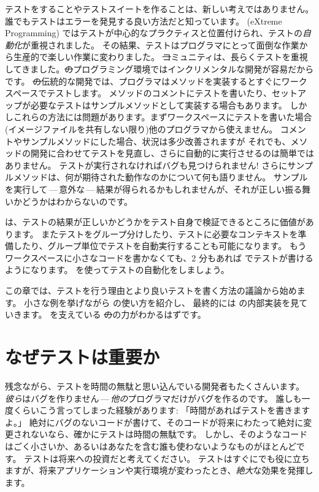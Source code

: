 \documentclass[a4paper,10pt,twoside]{book}
\begin{document}
テストをすることやテストスイートを作ることは、新しい考えではありません。
誰でもテストはエラーを発見する良い方法だと知っています。
\mbox{} (eXtreme Programming) ではテストが中心的なプラクティスと位置付けられ、テストの\emph{自動化}が重視されました。
その結果、テストはプログラマにとって面倒な作業から生産的で楽しい作業に変わりました。
\st コミュニティは、長らくテストを重視してきました。\st のプログラミング環境ではインクリメンタルな開発が容易だからです。
\st の伝統的な開発では、プログラマはメソッドを実装するとすぐにワークスペースでテストします。
メソッドのコメントにテストを書いたり、セットアップが必要なテストはサンプルメソッドとして実装する場合もあります。
しかしこれらの方法には問題があります。まずワークスペースにテストを書いた場合(イメージファイルを共有しない限り)他のプログラマから使えません。
コメントやサンプルメソッドにした場合、状況は多少改善されますが
それでも、メソッドの開発に合わせてテストを見直し、さらに自動的に実行させるのは簡単ではありません。
テストが実行されなければバグも見つけられません!
さらにサンプルメソッドは、何が期待された動作なのかについて何も語りません。
サンプルを実行して\,---\,意外な\,---\,結果が得られるかもしれませんが、それが正しい振る舞いかどうかはわからないのです。%

\sunit は、テストの結果が正しいかどうかをテスト自身で検証できるところに価値があります。
またテストをグループ分けしたり、テストに必要なコンテキストを準備したり、グループ単位でテストを自動実行することも可能になります。
もうワークスペースに小さなコードを書かなくても、2 分もあれば \sunit でテストが書けるようになります。
\sunit を使ってテストの自動化をしましょう。

この章では、テストを行う理由とより良いテストを書く方法の議論から始めます。
小さな例を挙げながら \sunit の使い方を紹介し、
最終的には \sunit の内部実装を見ていきます。
\sunit を支えている \st のの力がわかるはずです。

\section{なぜテストは重要か}

残念ながら、テストを時間の無駄と思い込んでいる開発者もたくさんいます。
\emph{彼ら}はバグを作りません\,---\,\emph{他の}プログラマだけがバグを作るのです。
誰しも一度くらいこう言ってしまった経験があります:
「時間があればテストを書きますよ。」
絶対にバグのないコードが書けて、そのコードが将来にわたって絶対に変更されないなら、確かにテストは時間の無駄です。
しかし、そのようなコードはごく小さいか、あるいはあなたを含む誰も使わないようなものがほとんどです。
テストは将来への投資だと考えてください。
テストはすぐにでも役に立ちますが、将来アプリケーションや実行環境が変わったとき、\emph{絶大}な効果を発揮します。
\end{document}
